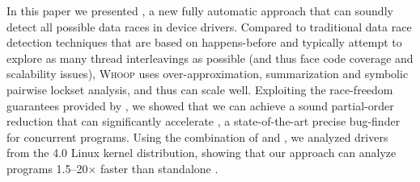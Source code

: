 In this paper we presented \whoop, a new fully automatic approach that can soundly detect all possible data races in device drivers. Compared to traditional data race detection techniques that are based on happens-before and typically attempt to explore as many thread interleavings as possible (and thus face code coverage and scalability issues), \textsc{Whoop} uses over-approximation, summarization and symbolic pairwise lockset analysis, and thus can scale well. Exploiting the race-freedom guarantees provided by \whoop, we showed that we can achieve a sound partial-order reduction that can significantly accelerate \corral, a state-of-the-art precise bug-finder for concurrent programs. Using the combination of \whoop and \corral, we analyzed \sizeOfBenchmarks drivers from the 4.0 Linux kernel distribution, showing that our approach can analyze programs 1.5--20$\times$ faster than standalone \corral.